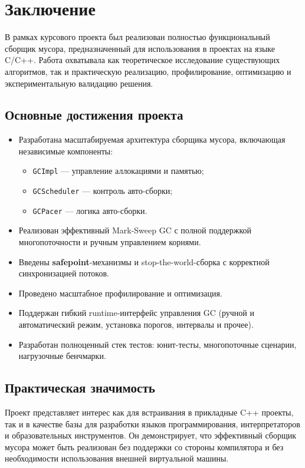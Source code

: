 \section{Заключение}

В рамках курсового проекта был реализован полностью функциональный сборщик мусора, предназначенный для использования в проектах на языке C/C++. Работа охватывала как теоретическое исследование существующих алгоритмов, так и практическую реализацию, профилирование, оптимизацию и экспериментальную валидацию решения.

\subsection*{Основные достижения проекта}

\begin{itemize}
    \item Разработана масштабируемая архитектура сборщика мусора, включающая независимые компоненты:
    \begin{itemize}
        \item \texttt{GCImpl} — управление аллокациями и памятью;
        \item \texttt{GCScheduler} — контроль авто-сборки;
        \item \texttt{GCPacer} — логика авто-сборки.
    \end{itemize}
    \item Реализован эффективный Mark-Sweep GC с полной поддержкой многопоточности и ручным управлением корнями.
    \item Введены \textbf{safepoint}-механизмы и stop-the-world-сборка с корректной синхронизацией потоков.
    \item Проведено масштабное профилирование и оптимизация.
    \item Поддержан гибкий runtime-интерфейс управления GC (ручной и автоматический режим, установка порогов, интервалы и прочее).
    \item Разработан полноценный стек тестов: юнит-тесты, многопоточные сценарии, нагрузочные бенчмарки.
\end{itemize}

\subsection*{Практическая значимость}

Проект представляет интерес как для встраивания в прикладные C++ проекты, так и в качестве базы для разработки языков программирования, интерпретаторов и образовательных инструментов. Он демонстрирует, что эффективный сборщик мусора может быть реализован без поддержки со стороны компилятора и без необходимости использования внешней виртуальной машины.


